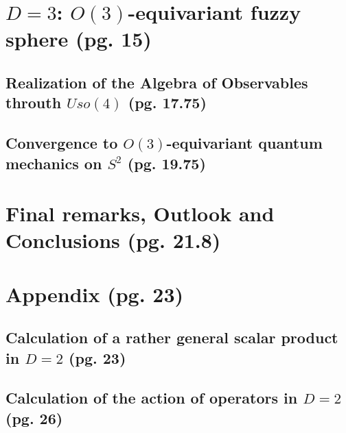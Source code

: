 \documentclass{article}
\begin{document}
\section{$D=3$: $O(3)$-equivariant fuzzy sphere (pg. 15)}

\subsection{Realization of the Algebra of Observables throuth $Uso(4)$ (pg. 17.75)}

\subsection{Convergence to $O(3)$-equivariant quantum mechanics on $S^2$ (pg. 19.75)}

\section{Final remarks, Outlook and Conclusions (pg. 21.8)}

\section{Appendix (pg. 23)}

\subsection{Calculation of a rather general scalar product in $D=2$ (pg. 23)}

\subsection{Calculation of the action of operators in $D=2$ (pg. 26)}
\end{document}
